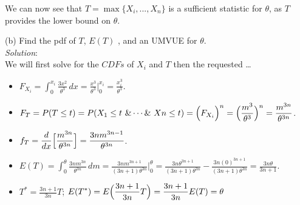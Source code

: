 \documentclass[12pt]{article}
\newcommand{\ds}{\displaystyle}
\begin{document}
\noindent
We can now see that $ \ds T = \max\{X_{i},...,X_{n}\} $ is a sufficient statistic for $ \theta $, as $ T $ provides the lower bound on $ \theta $. \\

\vspace{2.5mm}

(b) Find the pdf of $ T $, $ E(T)$ , and an UMVUE for $ \theta $.
\vspace{2.5mm} \\
\textit{Solution}:
\vspace{2.5mm} \\

\noindent
We will first solve for the $CDFs$ of $X_{i}$ and $T$ then the requested \dots

\begin{itemize}
    \item $ \ds F_{X_{i}} = \int_{0}^{x_{i}} \frac{3x^{2}}{\theta^{3}} \,dx = \frac{x^{3}}{\theta^{3}} \Big|_{0}^{x_{i}} = \frac{x_{i}^{3}}{\theta^{3}} $.
\end{itemize}

\begin{itemize}
    \item $ \ds F_{T} = P(T \le t) = P(X_{1} \le t \ \& \cdots \& \ X{n} \le t) = \Bigl( F_{X_{i}} \Bigr)^{n} = \Bigl( \frac{m^{3}}{\theta^{3}} \Bigr)^{n} = \frac{m^{3n}}{\theta^{3n}} $.
\end{itemize}

\begin{itemize}
    \item $ \ds f_{T} = \frac{d}{dx} \Bigl[ \frac{m^{3n}}{\theta^{3n}} \Bigr] = \frac{3nm^{3n-1}}{\theta^{3n}} $.
\end{itemize}

\begin{itemize}
    \item $ \ds E(T) = \int_{0}^{\theta} \frac{3nm^{3n}}{\theta^{3n}} \, dm = \frac{3nm^{3n + 1}}{(3n + 1)\theta^{3n}} \Big|_{0}^{\theta} = \frac{3n\theta^{3n + 1}}{(3n + 1)\theta^{3n}} - \frac{3n(0)^{3n + 1}}{(3n + 1)\theta^{3n}} = \frac{3n\theta}{3n + 1} $.
\end{itemize}

\begin{itemize}
    \item $ \ds T^{*} = \frac{3n+1}{3n}T $; $ \ds E(T^{*}) = E \Bigl( \frac{3n+1}{3n}T \Bigr) = \frac{3n+1}{3n} E( T ) = \theta $
\end{itemize}
\end{document}
